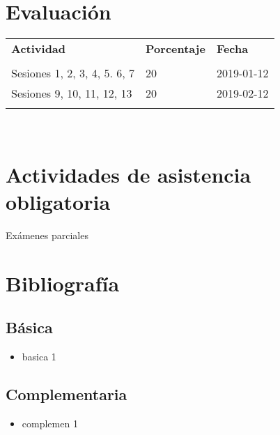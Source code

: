 \documentclass[11pt]{article}
\begin{document}
\section*{Evaluación}
\noindent \begin{tabular}{R{0.5\textwidth} C{0.2\textwidth} C{0.2\textwidth}}
	\toprule
	\textbf{Actividad} & \textbf{Porcentaje} & \textbf{Fecha} \\
	\\
	\midrule
	Sesiones 1, 2, 3, 4, 5. 6, 7 & 20 & 2019-01-12 \\ Sesiones 9, 10, 11, 12, 13 & 20 & 2019-02-12 \\ 
	\\
	\midrule
\end{tabular}
\\
\section*{Actividades de asistencia obligatoria}

Exámenes parciales

\section*{Bibliografía}

\subsection*{Básica}

\begin{itemize}
\item basica 1 
\end{itemize}

\subsection*{Complementaria}

\begin{itemize}
\item complemen 1 
\end{itemize}
\end{document}
